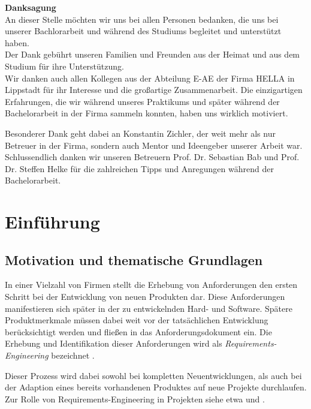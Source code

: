 \documentclass[12pt]{report}
\begin{document}
\thispagestyle{empty}
\textbf{Danksagung}
\vspace{12pt} \\
An dieser Stelle möchten wir uns bei allen Personen bedanken, die uns bei unserer Bachlorarbeit und während des Studiums begleitet und unterstützt haben.
\vspace{12pt} \\
Der Dank gebührt unseren Familien und Freunden aus der Heimat und aus dem Studium für ihre Unterstützung.
\vspace{12pt} \\
Wir danken auch allen Kollegen aus der Abteilung E-AE der Firma HELLA in Lippstadt für ihr Interesse und die großartige Zusammenarbeit. Die einzigartigen Erfahrungen, die wir während unseres Praktikums und später während der Bachelorarbeit in der Firma sammeln konnten, haben uns wirklich motiviert. 

Besonderer Dank geht dabei an Konstantin Zichler, der weit mehr als nur Betreuer in der Firma, sondern auch Mentor und Ideengeber unserer Arbeit war.
\vspace{12pt} \\
Schlussendlich danken wir unseren Betreuern Prof. Dr. Sebastian Bab und Prof. Dr. Steffen Helke für die zahlreichen Tipps und Anregungen während der Bachelorarbeit.
\newpage

\newpage
\chapter{Einführung}
\section[Motivation]{Motivation und thematische Grundlagen}
In einer Vielzahl von Firmen stellt die Erhebung von Anforderungen den ersten Schritt bei der Entwicklung von neuen Produkten dar. Diese Anforderungen manifestieren sich später in der zu entwickelnden Hard- und Software. Spätere Produktmerkmale müssen dabei weit vor der tatsächlichen Entwicklung berücksichtigt werden und fließen in das Anforderungsdokument ein. Die Erhebung und Identifikation dieser Anforderungen wird als \textit{Requirements-Engineering} bezeichnet \cite{bal10}.

Dieser Prozess wird dabei sowohl bei kompletten Neuentwicklungen, als auch bei der Adaption eines bereits vorhandenen Produktes auf neue Projekte durchlaufen. Zur Rolle von Requirements-Engineering in Projekten siehe etwa \cite{mw02} und \cite{hl01}. 
\end{document}
